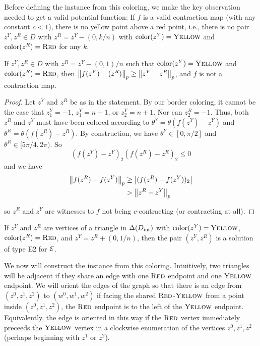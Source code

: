  Before defining the \EOPL instance from this coloring, we make the key observation needed to get a valid potential function: If $f$ is a valid contraction map (with any constant $c < 1$), there is no yellow point above a red point, i.e., there is no pair $z^Y,z^R \in D$ with $z^R = z^Y - (0,k/n)$ with $\operatorname{color}(z^Y) = \textsc{Yellow}$ and $\operatorname{color}(z^R) = \textsc{Red}$ for any $k$. 

  \begin{lemma} \label{lemma:YellowAboveRed}
    If $z^Y, z^R \in D$ with $z^R = z^Y - (0,1)/n$ such that $\operatorname{color}(z^Y) = \textsc{Yellow}$ and $\operatorname{color}(z^R) = \textsc{Red}$, then $\left\| f(z^Y) - (z^R) \right\|_p \geq \left\| z^Y - z^R \right\|_p$, and $f$ is not a contraction map.
  \end{lemma}

  \begin{proof}
    Let $z^Y$ and $z^R$ be as in the statement. By our border coloring, it cannot be the case that $z^Y_1 = -1$, $z^Y_1 = n+1$, or $z^Y_2 = n+1$. Nor can $z^R_2 = -1$. Thus, both $z^R$ and $z^Y$ must have been colored according to $\theta^Y = \theta(f(z^Y) - z^Y)$ and $\theta^R = \theta(f(z^R) - z^R)$. By construction, we have $\theta^Y \in [0,\pi/2]$ and $\theta^R \in [5\pi/4,2\pi)$. So \[ (f(z^Y) - z^Y)_2 (f(z^R) - z^R)_2 \leq 0 \] and we have
    \begin{align*}
      \left\| f(z^R) - f(z^Y) \right\|_p &\geq \left| (f(z^R) - f(z^Y))_2 \right| \\
                               &> \left\| z^R - z^Y \right\|_p
    \end{align*}

    so $z^R$ and $z^Y$ are witnesses to $f$ not being $c$-contracting (or contracting at all).
  \end{proof}

  \begin{corollary} \label{corollary:LeftEdgeIsSolution}
    If $z^Y$ and $z^R$ are vertices of a triangle in $\Delta(D_{\mathrm{int}})$ with $\operatorname{color}(z^Y) = \textsc{Yellow}$, $\operatorname{color}(z^R) = \textsc{Red}$, and $z^Y = z^R + (0,1/n)$, then the pair $(z^Y,z^R)$ is a solution of type E2 for $\mbox{${\mathcal E}$}$.
  \end{corollary}

  We now will construct the \EOPL instance from this coloring. Intuitively, two triangles will be adjacent if they share an edge with one $\textsc{Red}$ endpoint and one $\textsc{Yellow}$ endpoint. We will orient the edges of the \EOPL graph so that there is an edge from $(z^0, z^1, z^2)$ to $(w^0, w^1, w^2)$ if facing the shared $\textsc{Red}$-$\textsc{Yellow}$ from a point inside $(z^0, z^1, z^2)$, the $\textsc{Red}$ endpoint is to the left of the $\textsc{Yellow}$ endpoint. Equivalently, the edge is oriented in this way if the $\textsc{Red}$ vertex immediately preceeds the $\textsc{Yellow}$ vertex in a clockwise enumeration of the vertices $z^0,z^1,z^2$ (perhaps beginning with $z^1$ or $z^2$). 


